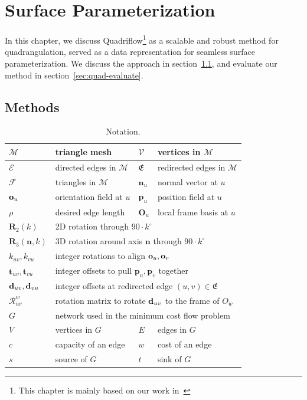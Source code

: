 \chapter{Surface Parameterization}
\label{chapter:param}
In this chapter, we discuss Quadriflow\footnote{This chapter is mainly based on our work in~\cite{huang2018quadriflow}} as a scalable and robust method for quadrangulation, served as a data representation for seamless surface parameterization. We discuss the approach in section~\ref{sec:quad-method}, and evaluate our method in section~\ref{sec:quad-evaluate}.

\section{Methods}
\label{sec:quad-method}
\begin{table}
\centering
\caption{Notation.}
\label{tab:quad-notation}
\begin{tabular}{|l|l|l|l|}
\hline
$\mathcal{M}$ & triangle mesh &
$\mathcal{V}$ & vertices in $\mathcal{M}$\\
\hline
$\mathcal{E}$ & directed edges in $\mathcal{M}$ &
$\mathfrak{E}$ & redirected edges in $\mathcal{M}$\\
\hline
$\mathcal{F}$ & triangles in $\mathcal{M}$ &
$\mathbf{n}_u$ & normal vector at $u$ \\
\hline
$\mathbf{o}_u$ & orientation field at $u$ &
$\mathbf{p}_u$ & position field at $u$\\
\hline
$\rho$ & desired edge length &
$\mathbf{O}_u$ & local frame basis at $u$ \\
\hline
$\mathbf{R}_2(k)$ & \multicolumn{3}{l|}{2D rotation through $90 \cdot k^\circ$}\\
\hline
$\mathbf{R}_3(\mathbf{n},k)$ & \multicolumn{3}{l|}{3D rotation around axis $\mathbf{n}$ through $90 \cdot k^\circ$}\\
\hline
$k_{uv},k_{vu}$ & \multicolumn{3}{l|}{integer rotations to align $\mathbf{o}_u,\mathbf{o}_v$}\\
\hline
$\mathbf{t}_{uv},\mathbf{t}_{vu}$ & \multicolumn{3}{l|}{integer offsets to pull $\mathbf{p}_u,\mathbf{p}_v$ together}\\
\hline
${\mathbf{d}}_{uv},{\mathbf{d}}_{vu}$ & \multicolumn{3}{l|}{integer offsets at redirected edge $(u,v)\in\mathfrak{E}$}\\
\hline
$\mathcal{R}^w_{uv}$ & \multicolumn{3}{l|}{rotation matrix to rotate ${\mathbf{d}}_{uv}$ to the frame of $O_w$} \\
\hline
$G$ & \multicolumn{3}{l|}{ network used in the minimum cost flow problem} \\
\hline
$V$ & vertices in $G$ &
$E$ & edges in $G$ \\
\hline
$c$ & capacity of an edge &
$w$ & cost of an edge \\
\hline
$s$ & source of $G$ &
$t$ & sink of $G$ \\
\hline
\end{tabular}
\end{table}

